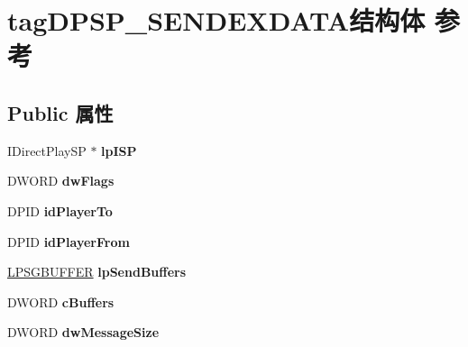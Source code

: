 \hypertarget{structtag_d_p_s_p___s_e_n_d_e_x_d_a_t_a}{}\section{tag\+D\+P\+S\+P\+\_\+\+S\+E\+N\+D\+E\+X\+D\+A\+T\+A结构体 参考}
\label{structtag_d_p_s_p___s_e_n_d_e_x_d_a_t_a}
\subsection*{Public 属性}
\begin{DoxyCompactItemize}
\item 
\mbox{\label{structtag_d_p_s_p___s_e_n_d_e_x_d_a_t_a_a12087107a4fdaf4b6075fdd132ff6ba1}} 
I\+Direct\+Play\+SP $\ast$ {\bfseries lp\+I\+SP}
\item 
\mbox{\label{structtag_d_p_s_p___s_e_n_d_e_x_d_a_t_a_a71410b7b75bb126ac5001f4b5f57974e}} 
D\+W\+O\+RD {\bfseries dw\+Flags}
\item 
\mbox{\label{structtag_d_p_s_p___s_e_n_d_e_x_d_a_t_a_aa99fe673f10684bf0e177a4a4fbc903f}} 
D\+P\+ID {\bfseries id\+Player\+To}
\item 
\mbox{\label{structtag_d_p_s_p___s_e_n_d_e_x_d_a_t_a_a3eb4e210934c2ea4e2b11b5a8bee8159}} 
D\+P\+ID {\bfseries id\+Player\+From}
\item 
\mbox{\label{structtag_d_p_s_p___s_e_n_d_e_x_d_a_t_a_a424774c807bbf9053007198bdaf208c3}} 
\hyperlink{struct_s_g_b_u_f_f_e_r}{L\+P\+S\+G\+B\+U\+F\+F\+ER} {\bfseries lp\+Send\+Buffers}
\item 
\mbox{\label{structtag_d_p_s_p___s_e_n_d_e_x_d_a_t_a_aaf0d8c19b8fe4b6fae77a50375591ccb}} 
D\+W\+O\+RD {\bfseries c\+Buffers}
\item 
\mbox{\label{structtag_d_p_s_p___s_e_n_d_e_x_d_a_t_a_a3e7e60fbfc8662aa36c5a10e34d78f1a}} 
D\+W\+O\+RD {\bfseries dw\+Message\+Size}
\item 

\end{DoxyCompactItemize}
